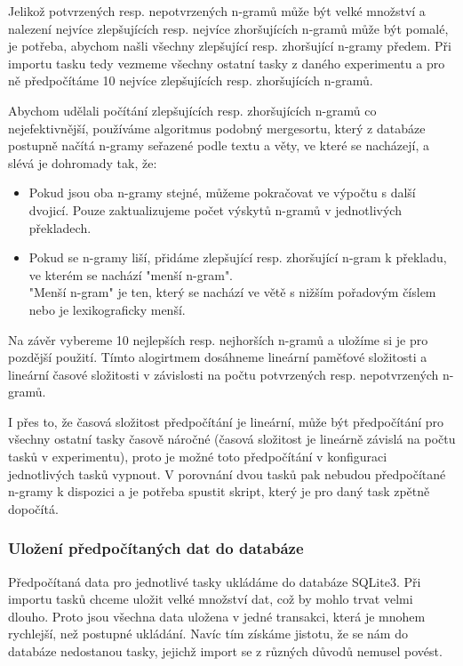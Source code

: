 Jelikož potvrzených resp. nepotvrzených n-gramů může být velké množství
  a nalezení nejvíce zlepšujících resp. nejvíce zhoršujících n-gramů může být pomalé,
  je potřeba,
  abychom našli všechny zlepšující resp. zhoršující n-gramy předem.
Při importu tasku tedy vezmeme všechny ostatní tasky z daného experimentu
  a pro ně předpočítáme 10 nejvíce zlepšujících resp. zhoršujících n-gramů. 

Abychom udělali počítání zlepšujících resp. zhoršujících n-gramů co nejefektivnější,
  používáme algoritmus podobný mergesortu,
  který z databáze postupně načítá n-gramy seřazené podle textu a věty, ve které se nacházejí, 
  a slévá je dohromady tak, že:

\begin{itemize}
  \item Pokud jsou oba n-gramy stejné, můžeme pokračovat ve výpočtu s další dvojicí.
    Pouze zaktualizujeme počet výskytů n-gramů v jednotlivých překladech. 
  \item Pokud se n-gramy liší, přidáme zlepšující resp. zhoršující n-gram k překladu,
    ve kterém se nachází "menší n-gram". \\
    "Menší n-gram" je ten, který se nachází ve větě s nižším pořadovým číslem
    nebo je lexikograficky menší.
\end{itemize}

Na závěr vybereme 10 nejlepších resp. nejhorších n-gramů
  a uložíme si je pro pozdější použití.
Tímto alogirtmem dosáhneme lineární paměťové složitosti a
  lineární časové složitosti v závislosti na počtu potvrzených resp. nepotvrzených n-gramů.

I přes to, že časová složitost předpočítání je lineární,
  může být předpočítání pro všechny ostatní tasky časově náročné
  (časová složitost je lineárně závislá na počtu tasků v experimentu),
  proto je možné toto předpočítání v konfiguraci jednotlivých tasků vypnout.
V porovnání dvou tasků pak nebudou předpočítané n-gramy k dispozici
  a je potřeba spustit skript,
  který je pro daný task zpětně dopočítá.

\subsubsection{Uložení předpočítaných dat do databáze}
Předpočítaná data pro jednotlivé tasky ukládáme do databáze SQLite3.
Při importu tasků chceme uložit velké množství dat,
  což by mohlo trvat velmi dlouho.
Proto jsou všechna data uložena v jedné transakci,
  která je mnohem rychlejší,
  než postupné ukládání.
Navíc tím získáme jistotu,
  že se nám do databáze nedostanou tasky,
  jejichž import se z různých důvodů nemusel povést.
 
